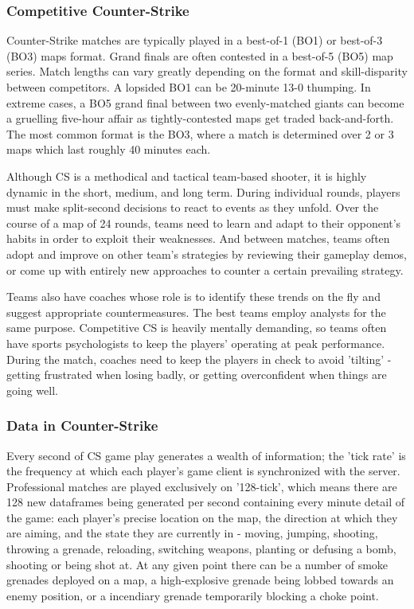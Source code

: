 \subsubsection{Competitive Counter-Strike}

Counter-Strike matches are typically played in a best-of-1 (BO1) or best-of-3 (BO3) maps format. Grand finals are often contested in a best-of-5 (BO5) map series. Match lengths can vary greatly depending on the format and skill-disparity between competitors. A lopsided BO1 can be 20-minute 13-0 thumping. In extreme cases, a BO5 grand final between two evenly-matched giants can become a gruelling five-hour affair as tightly-contested maps get traded back-and-forth. The most common format is the BO3, where a match is determined over 2 or 3 maps which last roughly 40 minutes each.

Although CS is a methodical and tactical team-based shooter, it is highly dynamic in the short, medium, and long term. During individual rounds, players must make split-second decisions to react to events as they unfold. Over the course of a map of 24 rounds, teams need to learn and adapt to their opponent's habits in order to exploit their weaknesses. And between matches, teams often adopt and improve on other team's strategies by reviewing their gameplay demos, or come up with entirely new approaches to counter a certain prevailing strategy.  

Teams also have coaches whose role is to identify these trends on the fly and suggest appropriate countermeasures. The best teams employ analysts for the same purpose. Competitive CS is heavily mentally demanding, so teams often have sports psychologists to keep the players' operating at peak performance. During the match, coaches need to keep the players in check to avoid 'tilting' - getting frustrated when losing badly, or getting overconfident when things are going well.


\subsubsection{Data in Counter-Strike}

Every second of CS game play generates a wealth of information; the 'tick rate' is the frequency at which each player's game client is synchronized with the server. Professional matches are played exclusively on '128-tick', which means there are 128 new dataframes being generated per second containing every minute detail of the game: each player's precise location on the map, the direction at which they are aiming, and the state they are currently in - moving, jumping, shooting, throwing a grenade, reloading, switching weapons, planting or defusing a bomb, shooting or being shot at. At any given point there can be a number of smoke grenades deployed on a map, a high-explosive grenade being lobbed towards an enemy position, or a incendiary grenade temporarily blocking a choke point.

